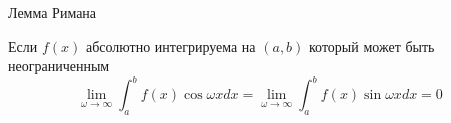 \begin{title}[\Large]
  Лемма Римана
\end{title}

\begin{theorem}
  Если $f(x)$ абсолютно интегрируема на $(a,b)$ который может быть
  неограниченным
  $$
  \lim_{\omega \to \infty} \int_a^b f(x) \cos \omega x dx
  =
  \lim_{\omega \to \infty} \int_a^b f(x) \sin \omega x dx
  = 0
  $$
\end{theorem}
